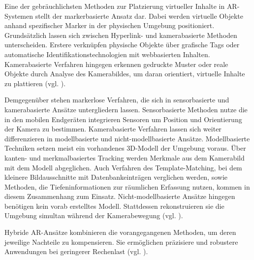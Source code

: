 Eine der gebräuchlichsten Methoden zur Platzierung virtueller Inhalte in \ac{AR}-Systemen stellt der markerbasierte Ansatz dar. 
Dabei werden virtuelle Objekte anhand spezifischer Marker in der physischen Umgebung positioniert. Grundsätzlich lassen sich zwischen Hyperlink- und kamerabasierte Methoden unterscheiden. Erstere verknüpfen physische Objekte über grafische Tags oder automatische Identifikationstechnologien mit webbasierten Inhalten. Kamerabasierte Verfahren hingegen erkennen gedruckte Muster oder reale Objekte durch Analyse des Kamerabildes, um daran orientiert, virtuelle Inhalte zu plattieren (vgl. \citealp[S. 3f]{el_barhoumi_assessment_2022}). 

Demgegenüber stehen markerlose Verfahren, die sich in sensorbasierte und kamerabasierte Ansätze untergliedern lassen. Sensorbasierte Methoden nutze die in den mobilen Endgeräten integrieren Sensoren um Position und Orientierung der Kamera zu bestimmen. Kamerabasierte Verfahren lassen sich weiter differenzieren in modellbasierte und nicht-modellbasierte Ansätze. Modellbasierte Techniken setzen meist ein vorhandenes \ac{3D}-Modell der Umgebung voraus. Über kanten- und merkmalbasiertes Tracking werden Merkmale aus dem Kamerabild mit dem Modell abgeglichen. Auch Verfahren des Template-Matching, bei dem kleinere Bildausschnitte mit Datenbankeinträgen verglichen werden, sowie Methoden, die Tiefeninformationen zur räumlichen Erfassung nutzen, kommen in diesem Zusammenhang zum Einsatz. Nicht-modellbasierte Ansätze hingegen benötigen kein vorab erstelltes Modell. Stattdessen rekonstruieren sie die Umgebung simultan während der Kamerabewegung (vgl. \citealp[S. 4f]{el_barhoumi_assessment_2022}).

Hybride \ac{AR}-Ansätze kombinieren die vorangegangenen Methoden, um deren jeweilige Nachteile zu kompensieren. Sie ermöglichen präzisiere und robustere Anwendungen bei geringerer Rechenlast (vgl. \citealp[S. 5]{el_barhoumi_assessment_2022}).